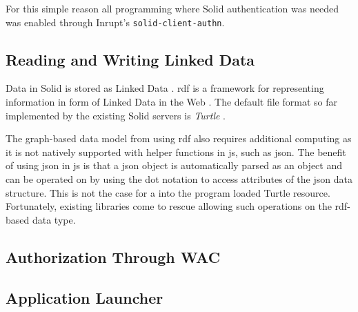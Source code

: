 For this simple reason all programming where Solid authentication was needed was enabled through Inrupt's \texttt{solid-client-authn}.

\subsection{Reading and Writing Linked Data}

Data in Solid is stored as Linked Data \cite{Malhotra:15:LDP}. \gls{rdf} is a framework for representing information in form of Linked Data in the Web \cite{Cyganiak:14:RCA}. The default file format so far implemented by the existing Solid servers is \textit{Turtle} \cite{Prud'hommeaux:14:RT}.

The graph-based data model from using \gls{rdf} also requires additional computing as it is not natively supported with helper functions in \gls{js}, such as \gls{json}. The benefit of using \gls{json} in \gls{js} is that a \gls{json} object is automatically parsed as an object and can be operated on by using the dot notation to access attributes of the \gls{json} data structure. This is not the case for a into the program loaded Turtle resource.
Fortunately, existing libraries come to rescue allowing such operations on the \gls{rdf}-based data type.



\subsection{Authorization Through WAC}

\subsection{Application Launcher}
